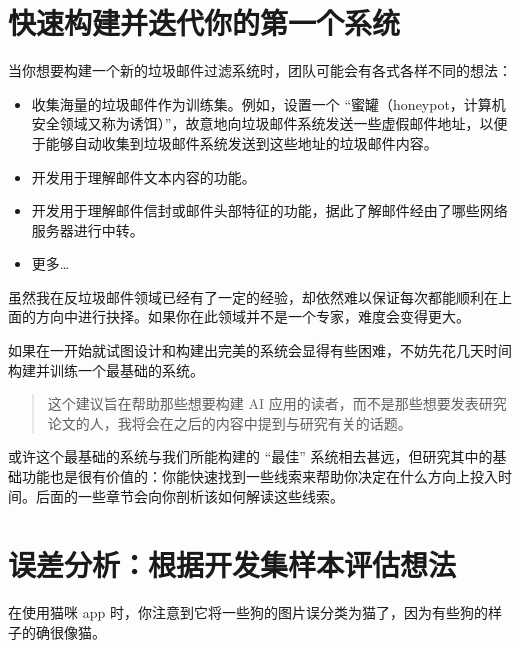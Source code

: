 \hypertarget{ux5febux901fux6784ux5efaux5e76ux8fedux4ee3ux4f60ux7684ux7b2cux4e00ux4e2aux7cfbux7edf}{%
\chapter{快速构建并迭代你的第一个系统}\label{ux5febux901fux6784ux5efaux5e76ux8fedux4ee3ux4f60ux7684ux7b2cux4e00ux4e2aux7cfbux7edf}}

当你想要构建一个新的垃圾邮件过滤系统时，团队可能会有各式各样不同的想法：

\begin{itemize}
\tightlist
\item
  收集海量的垃圾邮件作为训练集。例如，设置一个
  ``蜜罐（honeypot，计算机安全领域又称为诱饵）''，故意地向垃圾邮件系统发送一些虚假邮件地址，以便于能够自动收集到垃圾邮件系统发送到这些地址的垃圾邮件内容。
\item
  开发用于理解邮件文本内容的功能。
\item
  开发用于理解邮件信封或邮件头部特征的功能，据此了解邮件经由了哪些网络服务器进行中转。
\item
  更多\ldots{}
\end{itemize}

虽然我在反垃圾邮件领域已经有了一定的经验，却依然难以保证每次都能顺利在上面的方向中进行抉择。如果你在此领域并不是一个专家，难度会变得更大。

如果在一开始就试图设计和构建出完美的系统会显得有些困难，不妨先花几天时间构建并训练一个最基础的系统。

\begin{quote}
这个建议旨在帮助那些想要构建 AI
应用的读者，而不是那些想要发表研究论文的人，我将会在之后的内容中提到与研究有关的话题。
\end{quote}

或许这个最基础的系统与我们所能构建的 ``最佳''
系统相去甚远，但研究其中的基础功能也是很有价值的：你能快速找到一些线索来帮助你决定在什么方向上投入时间。后面的一些章节会向你剖析该如何解读这些线索。

\hypertarget{ux8befux5deeux5206ux6790ux6839ux636eux5f00ux53d1ux96c6ux6837ux672cux8bc4ux4f30ux60f3ux6cd5}{%
\chapter{误差分析：根据开发集样本评估想法}\label{ux8befux5deeux5206ux6790ux6839ux636eux5f00ux53d1ux96c6ux6837ux672cux8bc4ux4f30ux60f3ux6cd5}}

在使用猫咪 app
时，你注意到它将一些狗的图片误分类为猫了，因为有些狗的样子的确很像猫。

